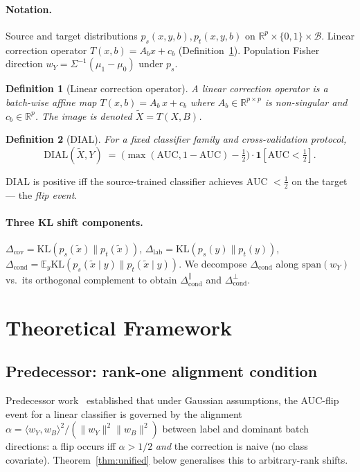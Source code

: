 \documentclass{article}
\newtheorem{definition}{Definition}
\newcommand{\R}{\mathbb{R}}
\newcommand{\E}{\mathbb{E}}
\newcommand{\KL}{\mathrm{KL}}
\newcommand{\dial}{\mathrm{DIAL}}
\begin{document}
\paragraph{Notation.}
Source and target distributions $p_s(x,y,b),p_t(x,y,b)$ on
$\R^{p}\times\{0,1\}\times\mathcal{B}$. Linear correction operator
$T(x,b)=A_b x+c_b$ (Definition~\ref{def:linear-correction}).
Population Fisher direction $w_Y=\Sigma^{-1}(\mu_1-\mu_0)$ under $p_s$.

\begin{definition}[Linear correction operator]
\label{def:linear-correction}
A \emph{linear correction operator} is a batch-wise affine map
$T(x,b) = A_b\,x + c_b$ where $A_b\in\R^{p\times p}$ is non-singular
and $c_b\in\R^{p}$. The image is denoted $\tilde X = T(X,B)$.
\end{definition}

\begin{definition}[DIAL]
\label{def:dial}
For a fixed classifier family and cross-validation protocol,
\[
   \dial(\tilde X,Y) \;=\; \bigl(\max(\mathrm{AUC},1{-}\mathrm{AUC})-\tfrac12\bigr)
   \cdot\mathbf{1}[\mathrm{AUC}<\tfrac12].
\]
\end{definition}

DIAL is positive iff the source-trained classifier achieves AUC $<\tfrac12$
on the target — the \emph{flip event}.

\paragraph{Three KL shift components.}
$\Delta_{\text{cov}}=\KL(p_s(\tilde x)\|p_t(\tilde x))$,
$\Delta_{\text{lab}}=\KL(p_s(y)\|p_t(y))$,
$\Delta_{\text{cond}}=\E_y\KL(p_s(\tilde x\mid y)\|p_t(\tilde x\mid y))$.
We decompose $\Delta_{\text{cond}}$ along $\mathrm{span}(w_Y)$ vs.\ its
orthogonal complement to obtain $\Delta_{\text{cond}}^{\parallel}$
and $\Delta_{\text{cond}}^{\perp}$.

\section{Theoretical Framework}
\label{sec:theory}

\subsection{Predecessor: rank-one alignment condition}
Predecessor work~\citep{cook2026v10} established that under Gaussian
assumptions, the AUC-flip event for a linear classifier is governed
by the alignment $\alpha=\langle w_Y,w_B\rangle^{2}/(\|w_Y\|^{2}\|w_B\|^{2})$
between label and dominant batch directions: a flip occurs iff
$\alpha>1/2$ \emph{and} the correction is naive (no class covariate).
Theorem~\ref{thm:unified} below generalises this to arbitrary-rank
shifts.
\end{document}
